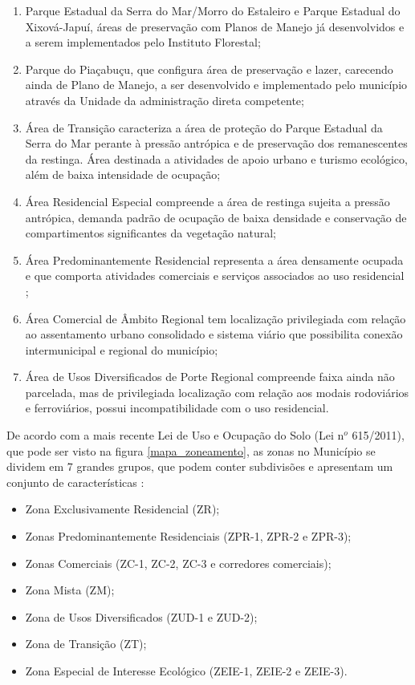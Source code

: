 	\begin{enumerate}[label=\alph*)]
		\item Parque Estadual da Serra do Mar/Morro do Estaleiro e Parque Estadual do Xixová-Japuí, áreas de preservação com Planos de Manejo já desenvolvidos e a serem implementados pelo Instituto Florestal; 
		\item Parque do Piaçabuçu, que configura área de preservação e lazer, carecendo ainda de Plano de Manejo, a ser desenvolvido e implementado pelo município através da Unidade da administração direta competente;
		\item Área de Transição caracteriza a área de proteção do Parque Estadual da Serra do Mar perante à pressão antrópica e de preservação dos remanescentes da restinga. Área destinada a atividades de apoio urbano e turismo ecológico, além de baixa intensidade de ocupação;
		\item Área Residencial Especial compreende a área de restinga sujeita a pressão antrópica, demanda padrão de ocupação de baixa densidade e conservação de compartimentos significantes da vegetação natural;
		\item Área Predominantemente Residencial representa a área densamente ocupada e que comporta atividades comerciais e serviços associados ao uso residencial ;
		\item Área Comercial de Âmbito Regional tem localização privilegiada com relação ao assentamento urbano consolidado e sistema viário que possibilita conexão intermunicipal e regional do município;
		\item Área de Usos Diversificados de Porte Regional compreende faixa ainda não parcelada, mas de privilegiada localização com relação aos modais rodoviários e ferroviários, possui incompatibilidade com o uso residencial.
	\end{enumerate}
	
	
	De acordo com a mais recente Lei de Uso e Ocupação do Solo (Lei n$^{o}$ 615/2011), que pode ser visto na figura \ref{mapa_zoneamento}, as zonas no Município se dividem em 7 grandes grupos, que podem conter subdivisões e apresentam um conjunto de características \cite[Cap. II, Art. 9\textordmasculine]{pmpg2011a}:
	
	\begin{itemize}
		\item Zona Exclusivamente Residencial (ZR);
		\item Zonas Predominantemente Residenciais (ZPR-1, ZPR-2 e ZPR-3);
		\item Zonas Comerciais (ZC-1, ZC-2, ZC-3 e corredores comerciais);
		\item Zona Mista (ZM);
		\item Zona de Usos Diversificados (ZUD-1 e ZUD-2);
		\item Zona de Transição (ZT);
		\item Zona Especial de Interesse Ecológico (ZEIE-1, ZEIE-2 e ZEIE-3).
	\end{itemize}
	
